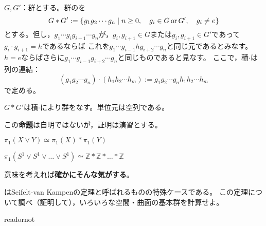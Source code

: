 \documentclass[uplatex]{jsarticle}
\begin{document}
\begin{teigi}[準備：群の自由積]
  $G,G'$：群とする。群のを
  \begin{equation}
    G * G' := \Set{\hspace{-1.8pt} g_{1}g_{2} \cdots g_{n} | n \ge 0, \quad g_{i} \in G \, \text{or} \, G', \quad g_{i} \neq e \hspace{-1.8pt}}
  \end{equation}
  とする。但し，$g_{1} \cdots g_{i} g_{i+1} \cdots g_{n}$が，$g_{i}, g_{i+1} \in G$または$g_{i}, g_{i+1} \in G'$であって$g_{i} \cdot g_{i+1} = h$であるならば
  これを$g_{1} \cdots g_{i-1} h g_{i+2} \cdots g_{n}$と同じ元であるとみなす。$h = e$ならばさらに$g_{1} \cdots g_{i-1} g_{i+2} \cdots g_{n}$と同じものであると見なす。
  ここで，積$\cdot$は列の連結：
  \begin{equation}
    ( g_{1} g_{2} \cdots g_{n}) \cdot (h_{1} h_{2} \cdots h_{m}) := g_{1} g_{2} \cdots g_{n} h_{1} h_{2} \cdots h_{m}
  \end{equation}
  で定める。
\end{teigi}

\begin{prop}
  $G * G'$は積$\cdot$により群をなす。単位元は空列である。
\end{prop}

この{\bf 命題}は自明ではないが，証明は演習とする。

\begin{teiri}
  \label{kihongun.Seifelt}
  $\pi_{1} (X \vee Y) \simeq \pi_{1} (X) * \pi_{1} (Y)$
\end{teiri}

\begin{corr}
  $\pi_{1} (S^{1} \vee S^{1} \vee \dots \vee S^{1}) \simeq \mathbb{Z} * \mathbb{Z} * \dots * \mathbb{Z}$
\end{corr}

意味を考えれば{\bf 確かにそんな気がする}。

\sukima {} はSeifelt-van Kampenの定理と呼ばれるものの特殊ケースである。
この定理について調べ（証明して），いろいろな空間・曲面の基本群を計算せよ。

\expandafter\ifx\csname readornot\endcsname\relax
  
\end{document}
